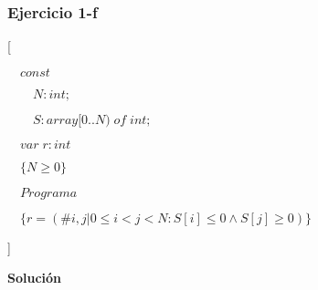 \documentclass[hidelinks]{article}
\begin{document}
\newpage


\subsubsection{Ejercicio 1-f}

[\par
$\quad const $\par
$\qquad N: int;$\par
$\qquad S: array[0..N) \; of \; int;$\par
$\quad var \; r: int$\par
$\quad\{N \geq 0\}$\par
$\quad Programa $ \par
$\quad \{r = (\# i,j| 0\leq i < j < N :S[i] \leq 0 \land S[j] \geq 0)\}$ \par
]

\textbf{Solución}
\end{document}

